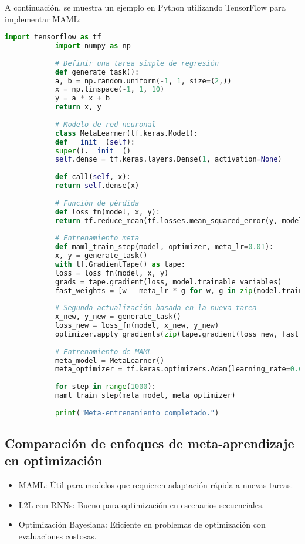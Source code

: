 \begin{itemize}
		A continuación, se muestra un ejemplo en Python utilizando TensorFlow para implementar MAML:
		
		\begin{lstlisting}[language=Python, caption={Implementación de MAML en TensorFlow}]
			import tensorflow as tf
			import numpy as np
			
			# Definir una tarea simple de regresión
			def generate_task():
			a, b = np.random.uniform(-1, 1, size=(2,))
			x = np.linspace(-1, 1, 10)
			y = a * x + b
			return x, y
			
			# Modelo de red neuronal
			class MetaLearner(tf.keras.Model):
			def __init__(self):
			super().__init__()
			self.dense = tf.keras.layers.Dense(1, activation=None)
			
			def call(self, x):
			return self.dense(x)
			
			# Función de pérdida
			def loss_fn(model, x, y):
			return tf.reduce_mean(tf.losses.mean_squared_error(y, model(x)))
			
			# Entrenamiento meta
			def maml_train_step(model, optimizer, meta_lr=0.01):
			x, y = generate_task()
			with tf.GradientTape() as tape:
			loss = loss_fn(model, x, y)
			grads = tape.gradient(loss, model.trainable_variables)
			fast_weights = [w - meta_lr * g for w, g in zip(model.trainable_variables, grads)]
			
			# Segunda actualización basada en la nueva tarea
			x_new, y_new = generate_task()
			loss_new = loss_fn(model, x_new, y_new)
			optimizer.apply_gradients(zip(tape.gradient(loss_new, fast_weights), model.trainable_variables))
			
			# Entrenamiento de MAML
			meta_model = MetaLearner()
			meta_optimizer = tf.keras.optimizers.Adam(learning_rate=0.001)
			
			for step in range(1000):
			maml_train_step(meta_model, meta_optimizer)
			
			print("Meta-entrenamiento completado.")
		\end{lstlisting}
		
		\subsection{Comparación de enfoques de meta-aprendizaje en optimización}
		
\begin{itemize}
			\item MAML: Útil para modelos que requieren adaptación rápida a nuevas tareas.
			\item L2L con RNNs: Bueno para optimización en escenarios secuenciales.
			\item Optimización Bayesiana: Eficiente en problemas de optimización con evaluaciones costosas.
\end{itemize}
		

\end{itemize}
